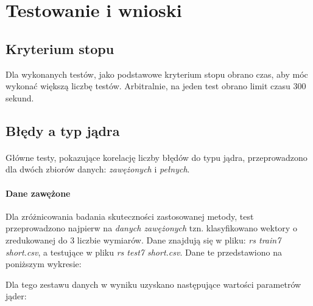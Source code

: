 \documentclass{article}
\begin{document}
\pagebreak
\section{Testowanie i wnioski}
\subsection{Kryterium stopu}
Dla wykonanych testów, jako podstawowe kryterium stopu obrano czas, aby móc wykonać większą liczbę testów. Arbitralnie, na jeden test obrano limit czasu 300 sekund.
\subsection{Błędy a typ jądra}
\paragraph{}
Główne testy, pokazujące korelację liczby błędów do typu jądra, przeprowadzono dla dwóch zbiorów danych: \textit{zawężonych} i \textit{pełnych}.
\paragraph {Dane zawężone} Dla zróżnicowania badania skuteczności zastosowanej metody, test przeprowadzono najpierw na \textit{danych zawężonych} tzn. klasyfikowano wektory o zredukowanej do 3 liczbie wymiarów. Dane znajdują się w pliku: \textit{rs train7 short.csv}, a testujące w pliku \textit{rs test7 short.csv}. Dane te przedstawiono na poniższym wykresie:
\pgfplotsset{width=6cm,compat=1.4}
\begin{center}
\end{center}

Dla tego zestawu danych w wyniku uzyskano następujące wartości parametrów jąder:
\end{document}
